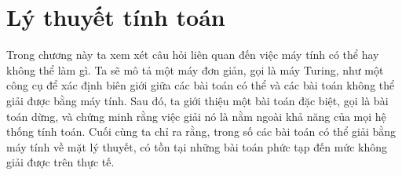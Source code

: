 \chapter{Lý thuyết tính toán}
\minitoc
\vspace{0.5cm}


%
\noindent
Trong chương này ta xem xét câu hỏi liên quan đến việc máy tính có thể hay không thể làm
gì. Ta sẽ mô tả một máy đơn giản, gọi là máy Turing, như một công cụ để xác định biên giới
giữa các bài toán có thể và các bài toán không thể giải được bằng máy tính. Sau đó, ta
giới thiệu một bài toán đặc biệt, gọi là bài toán dừng, và chứng minh rằng việc giải nó là
nằm ngoài khả năng của mọi hệ thống tính toán. Cuối cùng ta chỉ ra rằng, trong số các bài
toán có thể giải bằng máy tính về mặt lý thuyết, có tồn tại những bài toán phức tạp đến
mức không giải được trên thực tế.









